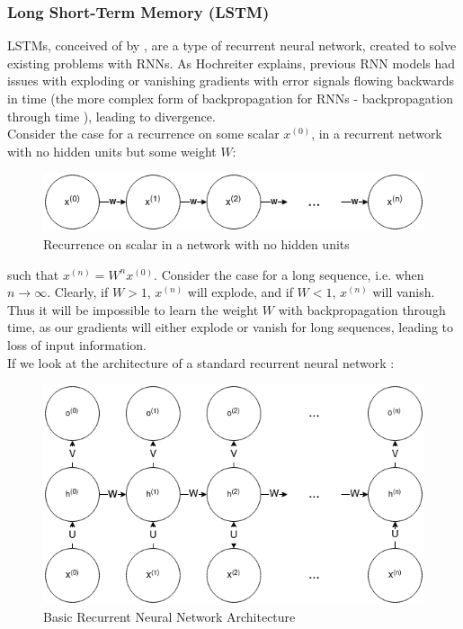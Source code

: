 \documentclass[12pt]{article}
\begin{document}
\subsubsection{Long Short-Term Memory (LSTM)}\label{lstms}
LSTMs, conceived of by \textcite{6795963}, are a type of recurrent neural network, created to solve existing problems with RNNs. As Hochreiter explains, previous RNN models had issues with exploding or vanishing gradients with error signals flowing backwards in time (the more complex form of backpropagation for RNNs - backpropagation through time \autocite{werbos1990backpropagation}), leading to divergence. \\\newline
Consider the case for a recurrence on some scalar $x^{(0)}$, in a recurrent network with no hidden units but some weight $W$:
\begin{figure}[H]
    \centering
    \includegraphics[scale=0.7]{22.png}
    \caption{Recurrence on scalar in a network with no hidden units}
\end{figure}
such that $x^{(n)} = W^nx^{(0)}$. Consider the case for a long sequence, i.e. when $n\rightarrow\infty$. Clearly, if $W>1$, $x^{(n)}$ will explode, and if $W<1$, $x^{(n)}$ will vanish. Thus it will be impossible to learn the weight $W$ with backpropagation through time, as our gradients will either explode or vanish for long sequences, leading to loss of input information.  \\\newline
If we look at the architecture of a standard recurrent neural network \autocite{Goodfellow-et-al-2016}:
\begin{figure}[H]
    \centering
    \includegraphics[scale=0.7]{23.png}
    \caption{Basic Recurrent Neural Network Architecture}
\end{figure}
\end{document}

